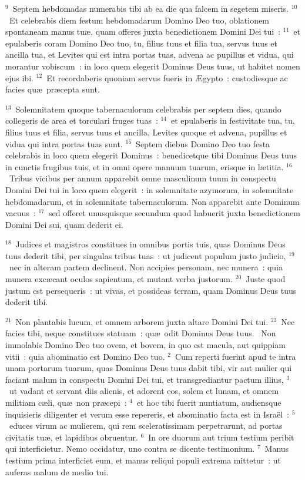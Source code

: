 ${}^{9}$~Septem hebdomadas numerabis tibi ab ea die qua falcem in segetem miseris.
${}^{10}$~Et celebrabis diem festum hebdomadarum Domino Deo tuo, oblationem spontaneam manus tu\ae , quam offeres juxta benedictionem Domini Dei tui~:
${}^{11}$~et epulaberis coram Domino Deo tuo, tu, filius tuus et filia tua, servus tuus et ancilla tua, et Levites qui est intra portas tuas, advena ac pupillus et vidua, qui morantur vobiscum~: in loco quem elegerit Dominus Deus tuus, ut habitet nomen ejus ibi.
${}^{12}$~Et recordaberis quoniam servus fueris in \AE gypto~: custodiesque ac facies qu\ae\ pr\ae cepta sunt.


${}^{13}$~Solemnitatem quoque tabernaculorum celebrabis per septem dies, quando collegeris de area et torculari fruges tuas~:
${}^{14}$~et epulaberis in festivitate tua, tu, filius tuus et filia, servus tuus et ancilla, Levites quoque et advena, pupillus et vidua qui intra portas tuas sunt.
${}^{15}$~Septem diebus Domino Deo tuo festa celebrabis in loco quem elegerit Dominus~: benedicetque tibi Dominus Deus tuus in cunctis frugibus tuis, et in omni opere manuum tuarum, erisque in l\ae titia.
${}^{16}$~Tribus vicibus per annum apparebit omne masculinum tuum in conspectu Domini Dei tui in loco quem elegerit~: in solemnitate azymorum, in solemnitate hebdomadarum, et in solemnitate tabernaculorum. Non apparebit ante Dominum vacuus~:
${}^{17}$~sed offeret unusquisque secundum quod habuerit juxta benedictionem Domini Dei sui, quam dederit ei.


${}^{18}$~Judices et magistros constitues in omnibus portis tuis, quas Dominus Deus tuus dederit tibi, per singulas tribus tuas~: ut judicent populum justo judicio,
${}^{19}$~nec in alteram partem declinent. Non accipies personam, nec munera~: quia munera exc\ae cant oculos sapientum, et mutant verba justorum.
${}^{20}$~Juste quod justum est persequeris~: ut vivas, et possideas terram, quam Dominus Deus tuus dederit tibi.


${}^{21}$~Non plantabis lucum, et omnem arborem juxta altare Domini Dei tui.
${}^{22}$~Nec facies tibi, neque constitues statuam~: qu\ae\ odit Dominus Deus tuus.
~\lettrine[lines=10,image=true,loversize=0.05,lraise=-0.03]{N}{}on immolabis Domino Deo tuo ovem, et bovem, in quo est macula, aut quippiam vitii~: quia abominatio est Domino Deo tuo.
${}^{2}$~Cum reperti fuerint apud te intra unam portarum tuarum, quas Dominus Deus tuus dabit tibi, vir aut mulier qui faciant malum in conspectu Domini Dei tui, et transgrediantur pactum illius,
${}^{3}$~ut vadant et servant diis alienis, et adorent eos, solem et lunam, et omnem militiam c\ae li, qu\ae\ non pr\ae cepi~:
${}^{4}$~et hoc tibi fuerit nuntiatum, audiensque inquisieris diligenter et verum esse repereris, et abominatio facta est in Isra\"el~:
${}^{5}$~educes virum ac mulierem, qui rem sceleratissimam perpetrarunt, ad portas civitatis tu\ae , et lapidibus obruentur.
${}^{6}$~In ore duorum aut trium testium peribit qui interficietur. Nemo occidatur, uno contra se dicente testimonium.
${}^{7}$~Manus testium prima interficiet eum, et manus reliqui populi extrema mittetur~: ut auferas malum de medio tui.


